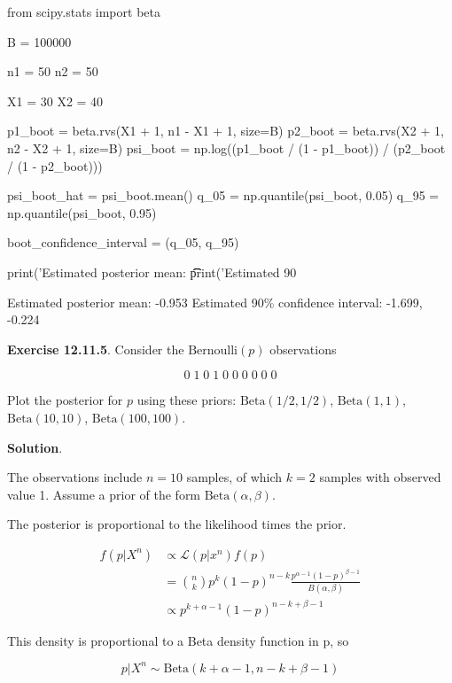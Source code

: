 \begin{python}
from scipy.stats import beta

B = 100000

n1 = 50
n2 = 50

X1 = 30
X2 = 40

p1_boot = beta.rvs(X1 + 1, n1 - X1 + 1, size=B)
p2_boot = beta.rvs(X2 + 1, n2 - X2 + 1, size=B)
psi_boot = np.log((p1_boot / (1 - p1_boot)) / (p2_boot / (1 - p2_boot)))

psi_boot_hat = psi_boot.mean()
q_{0}5 = np.quantile(psi_boot, 0.05)
q_95 = np.quantile(psi_boot, 0.95)

boot_confidence_{i}nterval = (q_{0}5, q_95)

print('Estimated posterior mean: \t\t %
print('Estimated 90%
\end{python}

\begin{console}
Estimated posterior mean:                -0.953
Estimated 90\% confidence interval:       -1.699, -0.224
\end{console}

\textbf{Exercise 12.11.5}. Consider the \(\text{Bernoulli}(p)\)
observations

\[ 0\; 1\; 0\; 1\; 0\; 0\; 0\; 0\; 0\; 0 \]

Plot the posterior for \(p\) using these priors:
\(\text{Beta}(1/2, 1/2)\), \(\text{Beta}(1, 1)\),
\(\text{Beta}(10, 10)\), \(\text{Beta}(100, 100)\).

\textbf{Solution}.

The observations include \(n = 10\) samples, of which \(k = 2\) samples
with observed value 1. Assume a prior of the form
\(\text{Beta}(\alpha, \beta)\).

The posterior is proportional to the likelihood times the prior.

\begin{align*}
f(p | X^{n}) & \propto \mathcal{L}(p | x^{n}) f(p) \\
&= \binom{n}{k} p^{k} (1 - p)^{n-k} \frac{p^{\alpha - 1}(1-p)^{\beta - 1}}{B(\alpha, \beta)}\\
&\propto p^{k + \alpha - 1} (1 - p)^{n - k + \beta - 1}
\end{align*}

This density is proportional to a Beta density function in p, so

\[p | X^{n} \sim \text{Beta}(k + \alpha - 1, n - k + \beta - 1)\]

